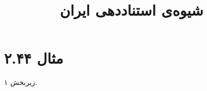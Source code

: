 \documentclass[a4paper,10pt]{article}
\begin{document}
\title{شیوه‌ی استناددهی ایران}
\author{}
\date{}
\maketitle



\section*{مثال ۲.۴۴}

زیربخش ۱.\\
\cite{بوسکالیا1978}\\
\cite{خوشدل1379}\\
\\
\\






\end{document}
